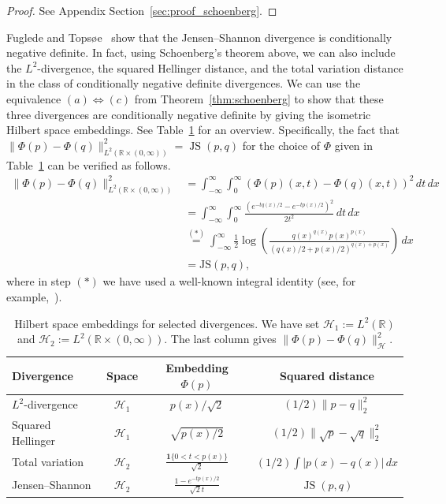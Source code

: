 \begin{proof}
    See Appendix Section~\ref{sec:proof_schoenberg}.
\end{proof}

Fuglede and Topsøe~\cite{fuglede_jensen-shannon_2004} show that the Jensen--Shannon divergence is conditionally negative definite. In fact, using Schoenberg's theorem above, we can also include the $L^2$-divergence, the squared Hellinger distance, and the total variation distance in the class of conditionally negative definite divergences. We can use the equivalence $(a)\iff(c)$ from Theorem~\ref{thm:schoenberg} to show that these three divergences are conditionally negative definite by giving the isometric Hilbert space embeddings. See Table~\ref{tab:hilbert_divergence_embeddings} for an overview. Specifically, the fact that $\|\Phi(p)-\Phi(q)\|_{L^2(\mathbb{R}\times(0,\infty))}^2=\operatorname{JS}(p,q)$ for the choice of $\Phi$ given in Table~\ref{tab:hilbert_divergence_embeddings} can be verified as follows.
\begin{align*}
    \|\Phi(p)-\Phi(q)\|_{L^2(\mathbb{R}\times(0,\infty))}^2&=\int_{-\infty}^{\infty}\int_0^{\infty}\left(\Phi(p)(x,t)-\Phi(q)(x,t)\right)^2\,dt\,dx\\&
    =\int_{-\infty}^{\infty}\int_{0}^{\infty}\frac{\left(e^{-tq(x)/2}-e^{-tp(x)/2}\right)^2}{2t^2}\,dt\,dx\\&
    \stackrel{(\ast)}{=}\int_{-\infty}^{\infty}\frac{1}{2}\log{\left(\frac{q(x)^{q(x)}p(x)^{p(x)}}{(q(x)/2+p(x)/2)^{q(x)+p(x)}}\right)}\,dx\\&
    =\text{JS}(p,q),
\end{align*}
where in step $(\ast)$ we have used a well-known integral identity (see, for example,~\cite{yomikuan2020integral}).

\begin{table}[htbp]
    \centering
    \renewcommand{\arraystretch}{1.4}
    \begin{tabular}{lccc}
        \hline
        Divergence & Space & Embedding $\Phi(p)$ & Squared distance\\
        \hline
        $L^2$-divergence & $\mathcal{H}_1$ & $p(x)/\sqrt{2}$ & $(1/2)\|p-q\|_2^2$\\
        Squared Hellinger & $\mathcal{H}_1$ & $\sqrt{p(x)/2}$ & $(1/2)\|\sqrt{p}-\sqrt{q}\|_2^2$\\
        Total variation & $\mathcal{H}_2$ & $\frac{\mathbf{1}\{0<t<p(x)\}}{\sqrt{2}}$ & $(1/2)\int|p(x)-q(x)|\,dx$\\
        Jensen--Shannon & $\mathcal{H}_2$ & $\frac{1-e^{-tp(x)/2}}{\sqrt{2}t}$ & $\operatorname{JS}(p,q)$\\
        \hline
    \end{tabular}
    \caption{Hilbert space embeddings for selected divergences. We have set $\mathcal{H}_1:=L^2(\mathbb{R})$ and $\mathcal{H}_2:=L^2(\mathbb{R}\times(0,\infty))$. The last column gives $\|\Phi(p)-\Phi(q)\|_{\mathcal{H}}^2$.}
    \label{tab:hilbert_divergence_embeddings}
\end{table}

